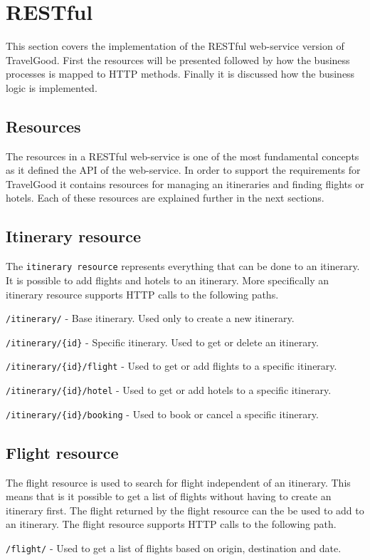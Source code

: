 \section{RESTful}
This section covers the implementation of the RESTful web-service version of TravelGood. First the resources will be presented followed by how the business processes is mapped to HTTP methods. Finally it is discussed how the business logic is implemented.

\subsection{Resources}
The resources in a RESTful web-service is one of the most fundamental concepts as it defined the API of the web-service. In order to support the requirements for TravelGood it contains resources for managing an itineraries and finding flights or hotels. Each of these resources are explained further in the next sections.

\subsection{Itinerary resource}
The \texttt{itinerary resource} represents everything that can be done to an itinerary. It is possible to add flights and hotels to an itinerary. More specifically an itinerary resource supports HTTP calls to the following paths.
\begin{description}
	\item \texttt{/itinerary/} - Base itinerary. Used only to create a new itinerary.
	\item \texttt{/itinerary/\{id\}} - Specific itinerary. Used to get or delete an itinerary.
	\item \texttt{/itinerary/\{id\}/flight} - Used to get or add flights to a specific itinerary.
	\item \texttt{/itinerary/\{id\}/hotel} - Used to get or add hotels to a specific itinerary.
	\item \texttt{/itinerary/\{id\}/booking} - Used to book or cancel a specific itinerary.
\end{description}

\subsection{Flight resource}
The flight resource is used to search for flight independent of an itinerary. This means that is it possible to get a list of flights without having to create an itinerary first. The flight returned by the flight resource can the be used to add to an itinerary. The flight resource supports HTTP calls to the following path.
\begin{description}
	\item \texttt{/flight/} - Used to get a list of flights based on origin, destination and date.
\end{description}

